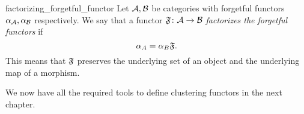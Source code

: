 \begin{definition}{}{factorizing_forgetful_functor}
Let $\mathcal{A}, \mathcal{B}$ be categories with forgetful functors $\alpha_{\mathcal{A}}, \alpha_{\mathcal{B}}$ respectively. We say that a functor $\mathfrak{F}\colon \mathcal{A} \to \mathcal{B}$ \emph{factorizes the forgetful functors} if
\begin{equation*}
    \alpha_A = \alpha_B \mathfrak{F}.
\end{equation*}
This means that $\mathfrak{F}$ preserves the underlying set of an object and the underlying map of a morphism.
\end{definition}

\medskip We now have all the required tools to define clustering functors in the next chapter.